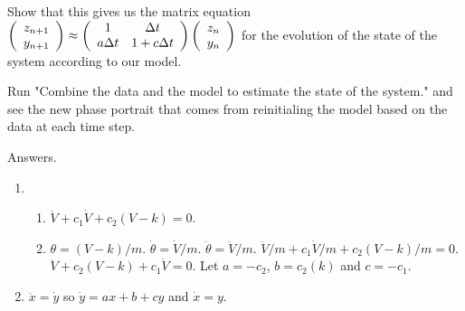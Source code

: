 \documentclass[12pt,letterpaper,noanswers]{exam}
\begin{document}
\begin{questions}
\begin{parts}
Show that this gives us the matrix equation $\left(\begin{array}{c} z_{n+1} \\ y_{n+1} \end{array}\right) \approx \left(\begin{array}{c c}1 & \Delta t \\ a\Delta t & 1+ c\Delta t  \end{array}\right)\left(\begin{array}{c}z_n \\ y_n \end{array}\right)$ for the evolution of the state of the system according to our model.

\item Run "Combine the data and the model to estimate the state of the system." and see the new phase portrait that comes from reinitialing the model based on the data at each time step.
\end{parts}

\end{questions}

Answers.
\begin{enumerate}
    \item \begin{enumerate}
        \item %
        $\ddot V + c_1 \dot V + c_2 (V-k) = 0$.
        
        \item $\theta = (V-k)/m$.  $\dot\theta = \dot V/m$.  $\ddot \theta = \ddot V/m$.  $\ddot V/m + c_1 \dot V/m + c_2 (V-k)/m = 0$.
         $\ddot V + c_2(V-k) + c_1 \dot V = 0$.  Let $ a= -c_2$, $b = c_2(k)$ and $c=-c_1$.
    \end{enumerate}
    \item $\ddot x = \dot y$ so $\dot y = a x + b + cy$ and $\dot x = y$.  
\end{enumerate}
\end{document}
